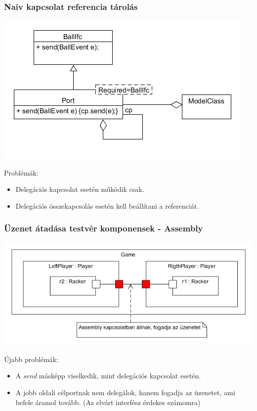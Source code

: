 \documentclass[11pt]{beamer}
\begin{document}
\begin{frame}
	\frametitle{Naiv kapcsolat referencia tárolás}
	\begin{center}
	\includegraphics[scale=0.5]{vedes_demo_delegref.png}
	\end{center}
	Problémák:
	\begin{itemize}
	\item Delegációs kapcsolat esetén működik csak.
	\item Delegációs összekapcsolás esetén kell beállítani a referenciát.
	\end{itemize}

\end{frame}


\begin{frame}
	\frametitle{Üzenet átadása testvér komponensek - Assembly}
	\begin{center}
	\includegraphics[scale=0.5]{vedes_demo_assconnect.png}
	\end{center}
	Újabb problémák:
	\begin{itemize}
	\item A \textit{send} másképp viselkedik, mint delegációs kapcsolat esetén.
	\item A jobb oldali célportnak nem delegálok, hanem fogadja az üzenetet, ami befele áramol tovább. (Az elvárt interfész érdekes számomra)
	\end{itemize}
		
\end{frame}
\end{document}
